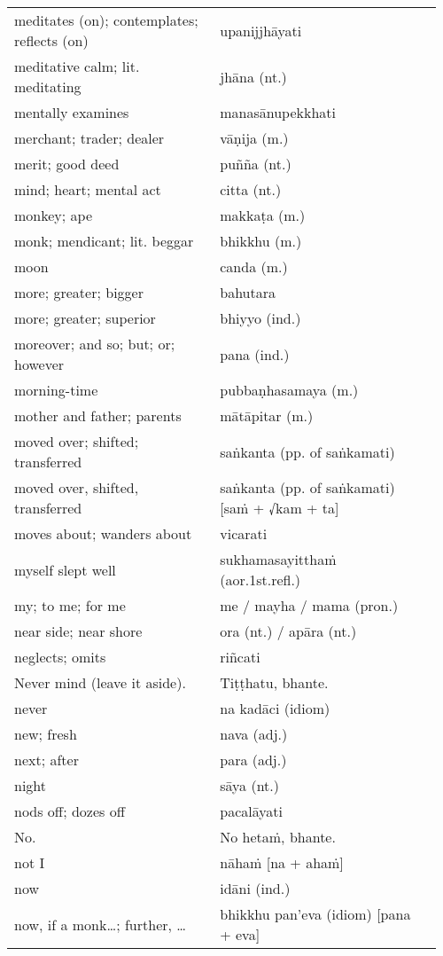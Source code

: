 \documentclass[a5paper]{memoir}
\begin{document}
\begin{longtable}{L{0.48\linewidth} L{0.48\linewidth} H}
meditates (on); contemplates; reflects (on) & upanijjhāyati & \\
meditative calm; lit. meditating & jhāna (nt.) & \\
mentally examines & manasānupekkhati & \\
merchant; trader; dealer & vāṇija (m.) & \\
merit; good deed & puñña (nt.) & \\
mind; heart; mental act & citta (nt.) & \\
monkey; ape & makkaṭa (m.) & \\
monk; mendicant; lit. beggar & bhikkhu (m.) & \\
moon & canda (m.) & \\
more; greater; bigger & bahutara & \\
more; greater; superior & bhiyyo (ind.) & \\
moreover; and so; but; or; however & pana (ind.) & \\
morning-time & pubbaṇhasamaya (m.) & \\
mother and father; parents & mātāpitar (m.) & \\
moved over; shifted; transferred & saṅkanta (pp. of saṅkamati) & \\
moved over, shifted, transferred & saṅkanta (pp. of saṅkamati) [saṁ + √kam + ta] & \\
moves about; wanders about & vicarati & \\
myself slept well & sukhamasayitthaṁ (aor.1st.refl.) & \\
my; to me; for me & me / mayha / mama (pron.) & \\
near side; near shore & ora (nt.) / apāra (nt.) & \\
neglects; omits & riñcati & \\
Never mind (leave it aside). & Tiṭṭhatu, bhante. & \\
never & na kadāci (idiom) & \\
new; fresh & nava (adj.) & \\
next; after & para (adj.) & \\
night & sāya (nt.) & \\
nods off; dozes off & pacalāyati & \\
No. & No hetaṁ, bhante. & \\
not I & nāhaṁ [na + ahaṁ] & \\
now & idāni (ind.) & \\
now, if a monk\ldots{}; further, \ldots{} & bhikkhu pan'eva (idiom) [pana + eva] & \\

\end{longtable}
\end{document}
